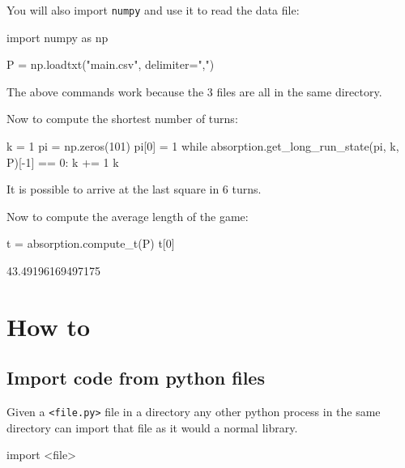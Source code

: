 You will also import \texttt{numpy} and use it to read the data file:

\begin{pyin}
import numpy as np

P = np.loadtxt("main.csv", delimiter=",")
\end{pyin}

\begin{note}
The above commands work because the 3 files are all in the same directory.
\end{note}



Now to compute the shortest number of turns:




\begin{pyin}
k = 1
pi = np.zeros(101)
pi[0] = 1
while absorption.get_long_run_state(pi, k, P)[-1] == 0:
    k += 1
k
\end{pyin}





It is possible to arrive at the last square in 6 turns.


Now to compute the average length of the game:





\begin{pyin}
t = absorption.compute_t(P)
t[0]
\end{pyin}



\begin{raw}
43.49196169497175
\end{raw}




\section{How to}

\subsection{Import code from python files}

Given a \texttt{<file.py>} file in a directory any other python process in the
same directory can import that file as it would a normal library.


\begin{api}
import <file>
\end{api}



